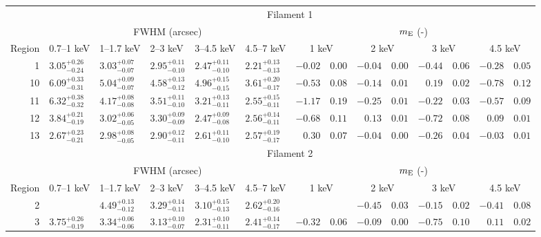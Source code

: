 \begin{tabular}{@{}rlllllr@{ $\pm$ }lr@{ $\pm$ }lr@{ $\pm$ }lr@{ $\pm$ }l@{}}
\toprule
{} & \multicolumn{13}{c}{Filament 1} \\
\cmidrule(l){2-14}
{} & \multicolumn{5}{c}{FWHM (arcsec)} & \multicolumn{8}{c}{$m_\mathrm{E}$ (-)} \\
\cmidrule(lr){2-6} \cmidrule(l){7-14}
Region & 0.7--1 keV & 1--1.7 keV & 2--3 keV & 3--4.5 keV & 4.5--7 keV
       & \multicolumn{2}{c}{1 keV} & \multicolumn{2}{c}{2 keV}
       & \multicolumn{2}{c}{3 keV} & \multicolumn{2}{c}{4.5 keV} \\
\cmidrule{1-14}
1 & ${3.05}^{+0.26}_{-0.24}$ & ${3.03}^{+0.07}_{-0.07}$ & ${2.95}^{+0.11}_{-0.10}$ & ${2.47}^{+0.11}_{-0.10}$ & ${2.21}^{+0.13}_{-0.13}$
  & $-0.02$ & $0.00$ & $-0.04$ & $0.00$ & $-0.44$ & $0.06$ & $-0.28$ & $0.05$ \\
10 & ${6.09}^{+0.33}_{-0.31}$ & ${5.04}^{+0.09}_{-0.07}$ & ${4.58}^{+0.13}_{-0.12}$ & ${4.96}^{+0.15}_{-0.15}$ & ${3.61}^{+0.20}_{-0.17}$
  & $-0.53$ & $0.08$ & $-0.14$ & $0.01$ & $0.19$ & $0.02$ & $-0.78$ & $0.12$ \\
11 & ${6.32}^{+0.38}_{-0.32}$ & ${4.17}^{+0.08}_{-0.08}$ & ${3.51}^{+0.11}_{-0.10}$ & ${3.21}^{+0.13}_{-0.11}$ & ${2.55}^{+0.15}_{-0.11}$
  & $-1.17$ & $0.19$ & $-0.25$ & $0.01$ & $-0.22$ & $0.03$ & $-0.57$ & $0.09$ \\
12 & ${3.84}^{+0.21}_{-0.19}$ & ${3.02}^{+0.06}_{-0.05}$ & ${3.30}^{+0.09}_{-0.09}$ & ${2.47}^{+0.09}_{-0.08}$ & ${2.56}^{+0.14}_{-0.11}$
  & $-0.68$ & $0.11$ & $0.13$ & $0.01$ & $-0.72$ & $0.08$ & $0.09$ & $0.01$ \\
13 & ${2.67}^{+0.23}_{-0.21}$ & ${2.98}^{+0.08}_{-0.05}$ & ${2.90}^{+0.12}_{-0.11}$ & ${2.61}^{+0.11}_{-0.10}$ & ${2.57}^{+0.19}_{-0.17}$
  & $0.30$ & $0.07$ & $-0.04$ & $0.00$ & $-0.26$ & $0.04$ & $-0.03$ & $0.01$ \\

\midrule
{} & \multicolumn{13}{c}{Filament 2} \\
\cmidrule(l){2-14}
{} & \multicolumn{5}{c}{FWHM (arcsec)} & \multicolumn{8}{c}{$m_\mathrm{E}$ (-)} \\
\cmidrule(lr){2-6} \cmidrule(l){7-14}
Region & 0.7--1 keV & 1--1.7 keV & 2--3 keV & 3--4.5 keV & 4.5--7 keV
       & \multicolumn{2}{c}{1 keV} & \multicolumn{2}{c}{2 keV}
       & \multicolumn{2}{c}{3 keV} & \multicolumn{2}{c}{4.5 keV} \\
\cmidrule{1-14}
2 & {} & ${4.49}^{+0.13}_{-0.12}$ & ${3.29}^{+0.14}_{-0.11}$ & ${3.10}^{+0.15}_{-0.13}$ & ${2.62}^{+0.20}_{-0.16}$
  & \multicolumn{2}{c}{} & $-0.45$ & $0.03$ & $-0.15$ & $0.02$ & $-0.41$ & $0.08$ \\
3 & ${3.75}^{+0.26}_{-0.19}$ & ${3.34}^{+0.06}_{-0.06}$ & ${3.13}^{+0.10}_{-0.07}$ & ${2.31}^{+0.10}_{-0.11}$ & ${2.41}^{+0.14}_{-0.17}$
  & $-0.32$ & $0.06$ & $-0.09$ & $0.00$ & $-0.75$ & $0.10$ & $0.11$ & $0.02$ \\


\end{tabular}
